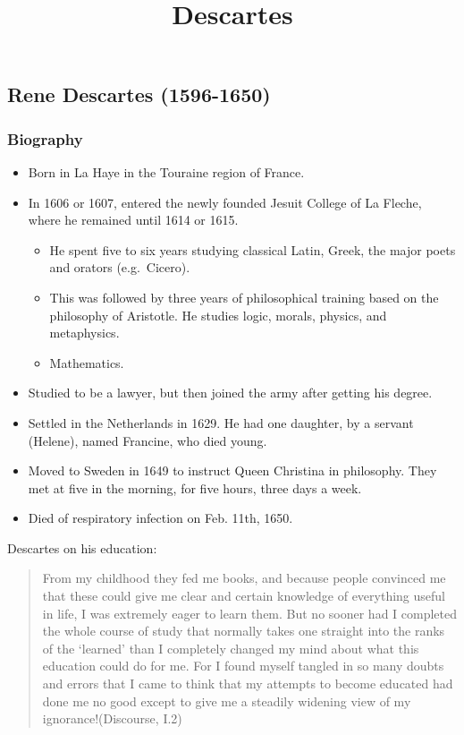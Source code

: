\documentclass[]{article}
\title{Descartes}
\date{}
\begin{document}
\maketitle

\subsection{Rene Descartes (1596-1650)}\label{rene-descartes-1596-1650}

\subsubsection{Biography}\label{biography}

\begin{itemize}
\item
  Born in La Haye in the Touraine region of France.
\item
  In 1606 or 1607, entered the newly founded Jesuit College of La
  Fleche, where he remained until 1614 or 1615.

  \begin{itemize}
  \itemsep1pt\parskip0pt
  \item
    He spent five to six years studying classical Latin, Greek, the
    major poets and orators (e.g.~Cicero).
  \item
    This was followed by three years of philosophical training based on
    the philosophy of Aristotle. He studies logic, morals, physics, and
    metaphysics.
  \item
    Mathematics.
  \end{itemize}
\item
  Studied to be a lawyer, but then joined the army after getting his
  degree.
\item
  Settled in the Netherlands in 1629. He had one daughter, by a servant
  (Helene), named Francine, who died young.
\item
  Moved to Sweden in 1649 to instruct Queen Christina in philosophy.
  They met at five in the morning, for five hours, three days a week.
\item
  Died of respiratory infection on Feb. 11th, 1650.
\end{itemize}

Descartes on his education:

\begin{quote}
From my childhood they fed me books, and because people convinced me
that these could give me clear and certain knowledge of everything
useful in life, I was extremely eager to learn them. But no sooner had I
completed the whole course of study that normally takes one straight
into the ranks of the `learned' than I completely changed my mind about
what this education could do for me. For I found myself tangled in so
many doubts and errors that I came to think that my attempts to become
educated had done me no good except to give me a steadily widening view
of my ignorance!(Discourse, I.2)
\end{quote}
\end{document}
